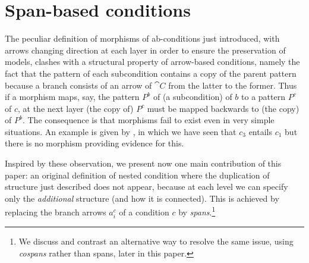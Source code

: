 \section{Span-based conditions}

The peculiar definition of morphisms of ab-conditions just introduced, with arrows changing direction at each layer in order to ensure the preservation of models, clashes with a structural property of arrow-based conditions, namely the fact that the pattern of each subcondition contains a copy of the parent pattern because a branch consists of an arrow of $\cat{C}$ from the latter to the former. Thus if a morphism maps, say, the pattern $P^b$ of (a subcondition) of $b$ to a pattern $P^c$ of $c$, at the next layer (the copy of) $P^c$ must be mapped backwards to (the copy) of $P^b$. The consequence is that morphisms fail to exist even in very simple situations. An example is given by , in which we have seen that $c_3$ entails $c_1$ but there is no morphism providing evidence for this.
  
Inspired by these observation, we present now one main contribution of this paper: an original definition of nested condition where the duplication of structure just described does not appear, because at each level we can specify only the \emph{additional} structure (and how it is connected). This is achieved by replacing the branch arrows $a^c_i$ of a condition $c$ by \emph{spans}.\footnote{We discuss and contrast an alternative way to resolve the same issue, using \emph{cospans} rather than spans, later in this paper.}


